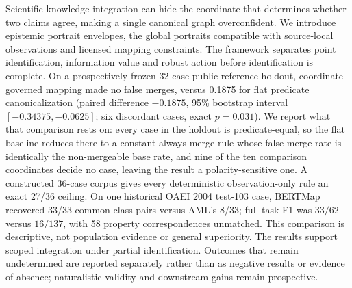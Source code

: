 Scientific knowledge integration can hide the coordinate that determines
whether two claims agree, making a single canonical graph overconfident. We
introduce epistemic portrait envelopes, the global portraits compatible with
source-local observations and licensed mapping constraints. The framework
separates point identification, information value and robust action before
identification is complete. On a prospectively frozen 32-case public-reference
holdout, coordinate-governed mapping made no false merges, versus 0.1875 for
flat predicate canonicalization (paired difference $-0.1875$, 95\% bootstrap
interval $[-0.34375,-0.0625]$; six discordant cases, exact $p=0.031$). We
report what that comparison rests on: every case in the holdout is
predicate-equal, so the flat baseline reduces there to a constant always-merge
rule whose false-merge rate is identically the non-mergeable base rate, and
nine of the ten comparison coordinates decide no case, leaving the result a
polarity-sensitive one. A constructed 36-case corpus gives every
deterministic observation-only rule an exact 27/36 ceiling. On one historical
OAEI 2004 test-103 case, BERTMap recovered 33/33 common class pairs versus
AML's 8/33; full-task F1 was $33/62$ versus $16/137$, with 58 property
correspondences unmatched. This comparison is descriptive, not population
evidence or general superiority. The results support scoped integration under
partial identification. Outcomes that remain undetermined are reported
separately rather than as negative results or evidence of absence;
naturalistic validity and downstream gains remain prospective.
\endinput
